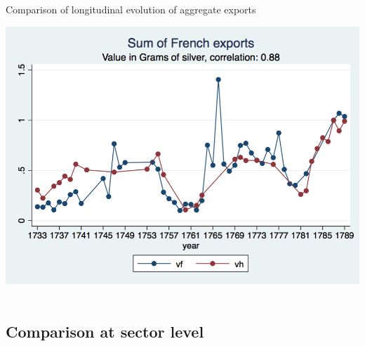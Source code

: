 \documentclass[12pt,a4paper,titlepage,english]{article}
\begin{document}
\begin{center}
\caption{Comparison of longitudinal evolution of aggregate exports}
\includegraphics[scale=.3]{long_evolution.png}\\~\\
\end{center}

\subsection{Comparison at sector level}
\end{document}
